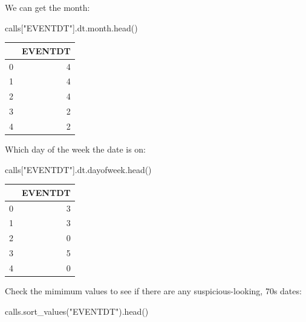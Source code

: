 \documentclass[
  letterpaper,
  DIV=11,
  numbers=noendperiod]{scrreprt}
\newenvironment{Shaded}{\begin{snugshade}}{\end{snugshade}}
\newcommand{\NormalTok}[1]{\textcolor[rgb]{0.00,0.23,0.31}{#1}}
\newcommand{\StringTok}[1]{\textcolor[rgb]{0.13,0.47,0.30}{#1}}
\begin{document}
We can get the month:

\begin{Shaded}
\begin{Highlighting}[]
\NormalTok{calls[}\StringTok{"EVENTDT"}\NormalTok{].dt.month.head()}
\end{Highlighting}
\end{Shaded}

\begin{tabular}{lr}
\toprule
{} &  EVENTDT \\
\midrule
0 &        4 \\
1 &        4 \\
2 &        4 \\
3 &        2 \\
4 &        2 \\
\bottomrule
\end{tabular}

Which day of the week the date is on:

\begin{Shaded}
\begin{Highlighting}[]
\NormalTok{calls[}\StringTok{"EVENTDT"}\NormalTok{].dt.dayofweek.head()}
\end{Highlighting}
\end{Shaded}

\begin{tabular}{lr}
\toprule
{} &  EVENTDT \\
\midrule
0 &        3 \\
1 &        3 \\
2 &        0 \\
3 &        5 \\
4 &        0 \\
\bottomrule
\end{tabular}

Check the mimimum values to see if there are any suspicious-looking, 70s
dates:

\begin{Shaded}
\begin{Highlighting}[]
\NormalTok{calls.sort\_values(}\StringTok{"EVENTDT"}\NormalTok{).head()}
\end{Highlighting}
\end{Shaded}
\end{document}
